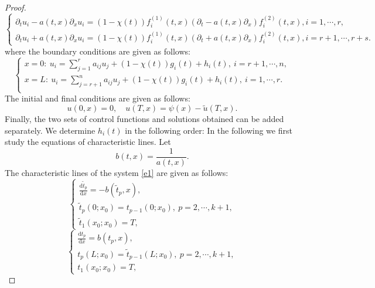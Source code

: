 \documentclass[a4paper,reqno,11pt]{amsart}
\numberwithin{equation}{section} %
\begin{document}
\begin{proof}
	\begin{equation}\label{e6}
		\left\{\begin{array}{l}
		\partial_t u_i- a(t,x)\partial_x u_i=(1-\chi (t))f^{(1)}_i(t,x)(\partial_t - a(t,x)\partial_x)f^{(2)}_i(t,x), i=1, \cdots, r, \\
		\partial_t u_i+ a(t,x)\partial_x u_i=(1-\chi (t))f^{(1)}_i(t,x)(\partial_t + a(t,x)\partial_x)f^{(2)}_i(t,x), i=r+1, \cdots, r+s.
		\end{array}\right.
	\end{equation}
where the boundary conditions are given as follows:
\begin{equation}\label{e7}
		\left\{ \begin{array}{l}
		x=0:\ u_i=\sum_{j=1}^r{a_{ij}u_j + (1-\chi (t))g_i(t) + h_i\left( t \right) ,\ i=r+1,\cdots ,n,}\\
		x=L:\ u_i=\sum_{j=r+1}^n{a_{ij}u_j +(1-\chi (t))g_i(t) + h_i\left( t \right) ,\ i=1,\cdots ,r.}\\
		\end{array} \right. 
	\end{equation}
The initial and final conditions are given as follows:
\begin{equation}\label{e8}
		u(0,x)=0 ,\quad u(T,x)=\psi (x)- \tilde{u}(T,x).
	\end{equation}
Finally, the two sets of control functions and solutions obtained can be added separately.
We determine $h_i\left( t \right)$ in the following order:
In the following we first study the equations of characteristic lines. Let 
$$
b(t,x)=\frac{1}{a(t,x)}.
$$
The characteristic lines of the system \eqref{e1} are given as follows:
\begin{equation}\label{27}
    \left\{ \begin{array}{l}
        \frac{\text{d}\tilde{t} _p}{\text{d}x}= -b\left( \tilde{t} _p ,x \right), \\
        \tilde{t} _p(0;x_0) = t_{p-1}(0;x_0) ,\ p=2,\cdots ,k+1,\\
        \tilde{t} _1(x_0;x_0) = T,
    \end{array} \right. 
    \end{equation}
\begin{equation}\label{28}
    \left\{ \begin{array}{l}
        \frac{\text{d}t_p}{\text{d}x}= b\left( t_p,x \right) ,\\
        t_p(L;x_0) = \tilde{t} _{p-1}(L;x_0) ,\ p=2,\cdots ,k+1,\\
        t_1(x_0;x_0) = T,
    \end{array} \right. 

\end{equation}
\end{proof}
\end{document}
